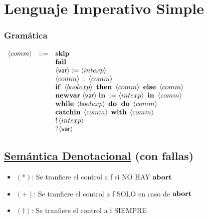 \section{Lenguaje Imperativo Simple}
  \subsubsection*{Gramática}
    $\begin{array}{llllll}
      \comm & ::= & \textbf{skip} \\
      && \fail \\
      && \var := \intexp \\
      && \comm\ ;\ \comm \\ 
      && \ife \boolexp\thene\comm\elsee\comm \\ 
      && \newvar \var:=\intexp\ine\comm \\ 
      && \while \boolexp\doc\comm \\
      && \catch{\comm}{\comm} \\
      && \mathbb{!} \intexp \\
      && \mathbb{?} \var \\
    \end{array}$

  \subsection*{\underline{Semántica Denotacional} (con fallas)}
    \begin{itemize}
      \item $(\ast)$: Se tranfiere el control a f si NO HAY $\abort$
      \item $(+)$: Se tranfiere el control a f SOLO en caso de $\abort$
      \item $(\dag)$: Se tranfiere el control a f SIEMPRE
    \end{itemize}

    \pagebreak

